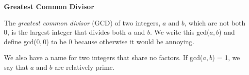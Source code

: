 \documentclass{article}
\begin{document}
\begin{flushleft}
      \LARGE\textbf{Greatest Common Divisor}\normalsize\\ \vspace{11pt}

      The \textit{greatest common divisor} (GCD) of two integers, $a$ and $b$, which are not both 0, is the largest integer that divides both $a$ and $b$. We write this gcd($a, b$) and define gcd($0, 0$) to be 0 because otherwise it would be annoying.\\ \vspace{11pt}

      We also have a name for two integers that share no factors. If gcd($a, b$) = 1, we say that $a$ and $b$ are relatively prime.
\end{flushleft}
\end{document}
